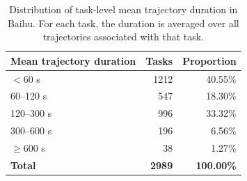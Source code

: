 \begin{table}[t]
\centering
\caption{Distribution of task-level mean trajectory duration in Baihu. For each task, the duration is averaged over all trajectories associated with that task.}
\label{tab:task-duration}
\small
\begin{tabular}{lrr}
\toprule
Mean trajectory duration & Tasks & Proportion \\
\midrule
$<60$ s & 1212 & 40.55\% \\
60--120 s & 547 & 18.30\% \\
120--300 s & 996 & 33.32\% \\
300--600 s & 196 & 6.56\% \\
$\geq 600$ s & 38 & 1.27\% \\
\textbf{Total} & \textbf{2989} & \textbf{100.00\%} \\
\bottomrule
\end{tabular}
\end{table}
